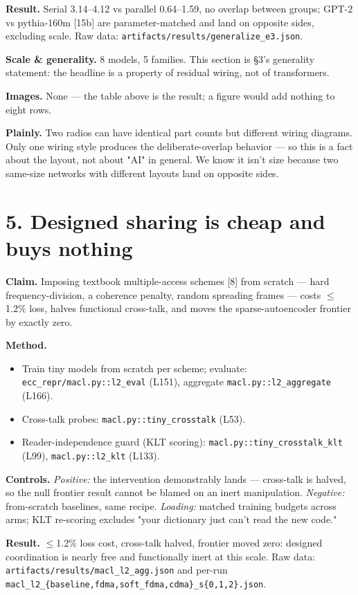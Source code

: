 \documentclass[10pt]{article}
\begin{document}
\textbf{Result.} Serial 3.14--4.12 vs parallel 0.64--1.59, no overlap between groups; GPT-2 vs
pythia-160m [15b] are parameter-matched and land on opposite sides, excluding scale. Raw data:
\texttt{artifacts/results/generalize\_e3.json}.

\textbf{Scale \& generality.} 8 models, 5 families. This section is §3's generality statement: the
headline is a property of residual wiring, not of transformers.

\textbf{Images.} None --- the table above is the result; a figure would add nothing to eight rows.

\textbf{Plainly.} Two radios can have identical part counts but different wiring diagrams. Only one
wiring style produces the deliberate-overlap behavior --- so this is a fact about the layout, not
about "AI" in general. We know it isn't size because two same-size networks with different layouts
land on opposite sides.

\section{5. Designed sharing is cheap and buys nothing}

\textbf{Claim.} Imposing textbook multiple-access schemes [8] from scratch --- hard frequency-division, a
coherence penalty, random spreading frames --- costs $\le$1.2\% loss, halves functional cross-talk, and
moves the sparse-autoencoder frontier by exactly zero.

\textbf{Method.}
\begin{itemize}\setlength\itemsep{1pt}
\item Train tiny models from scratch per scheme; evaluate: \texttt{ecc\_repr/macl.py::l2\_eval} (L151), aggregate \texttt{macl.py::l2\_aggregate} (L166).
\item Cross-talk probes: \texttt{macl.py::tiny\_crosstalk} (L53).
\item Reader-independence guard (KLT scoring): \texttt{macl.py::tiny\_crosstalk\_klt} (L99), \texttt{macl.py::l2\_klt} (L133).
\end{itemize}
\textbf{Controls.} \emph{Positive:} the intervention demonstrably lands --- cross-talk is halved, so the null
frontier result cannot be blamed on an inert manipulation. \emph{Negative:} from-scratch baselines, same
recipe. \emph{Loading:} matched training budgets across arms; KLT re-scoring excludes "your dictionary
just can't read the new code."

\textbf{Result.} $\le$1.2\% loss cost, cross-talk halved, frontier moved zero: designed coordination is
nearly free and functionally inert at this scale. Raw data: \texttt{artifacts/results/macl\_l2\_agg.json}
and per-run \texttt{macl\_l2\_\{baseline,fdma,soft\_fdma,cdma\}\_s\{0,1,2\}.json}.
\end{document}
